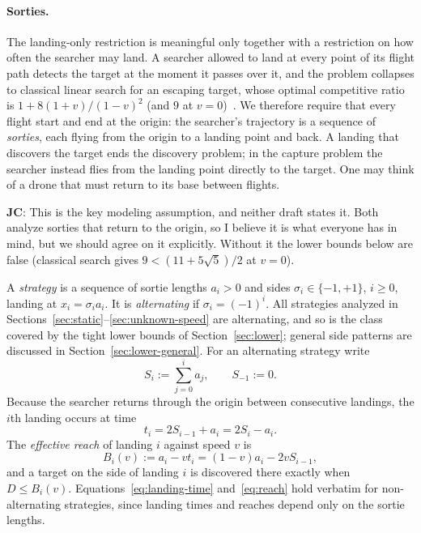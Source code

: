 \documentclass[runningheads,envcountsame,envcountsect]{llncs}
\newcommand\JC[1]{{\color{Maroon} \textbf{JC}: #1}}
\begin{document}
\paragraph{Sorties.} The landing-only restriction is meaningful only together with a restriction on how often the searcher may land. A searcher allowed to land at every point of its flight path detects the target at the moment it passes over it, and the problem collapses to classical linear search for an escaping target, whose optimal competitive ratio is $1 + 8(1+v)/(1-v)^2$ (and $9$ at $v = 0$)~\cite{alpern2003theory,coleman2022oblivious}. We therefore require that every flight start and end at the origin: the searcher's trajectory is a sequence of \emph{sorties}, each flying from the origin to a landing point and back. A landing that discovers the target ends the discovery problem; in the capture problem the searcher instead flies from the landing point directly to the target. One may think of a drone that must return to its base between flights.

\JC{This is the key modeling assumption, and neither draft states it. Both analyze sorties that return to the origin, so I believe it is what everyone has in mind, but we should agree on it explicitly. Without it the lower bounds below are false (classical search gives $9 < (11+5\sqrt5)/2$ at $v = 0$).}

A \emph{strategy} is a sequence of sortie lengths $a_i > 0$ and sides $\sigma_i \in \{-1, +1\}$, $i \geq 0$, landing at $x_i = \sigma_i a_i$. It is \emph{alternating} if $\sigma_i = (-1)^i$. All strategies analyzed in Sections~\ref{sec:static}--\ref{sec:unknown-speed} are alternating, and so is the class covered by the tight lower bounds of Section~\ref{sec:lower}; general side patterns are discussed in Section~\ref{sec:lower-general}. For an alternating strategy write
\[
  S_i := \sum_{j=0}^{i} a_j, \qquad S_{-1} := 0 .
\]
Because the searcher returns through the origin between consecutive landings, the $i$th landing occurs at time
\begin{equation}\label{eq:landing-time}
  t_i = 2 S_{i-1} + a_i = 2 S_i - a_i .
\end{equation}
The \emph{effective reach} of landing $i$ against speed $v$ is
\begin{equation}\label{eq:reach}
  B_i(v) := a_i - v t_i = (1-v) a_i - 2 v S_{i-1} ,
\end{equation}
and a target on the side of landing $i$ is discovered there exactly when $D \leq B_i(v)$. Equations~\eqref{eq:landing-time} and~\eqref{eq:reach} hold verbatim for non-alternating strategies, since landing times and reaches depend only on the sortie lengths.
\end{document}
